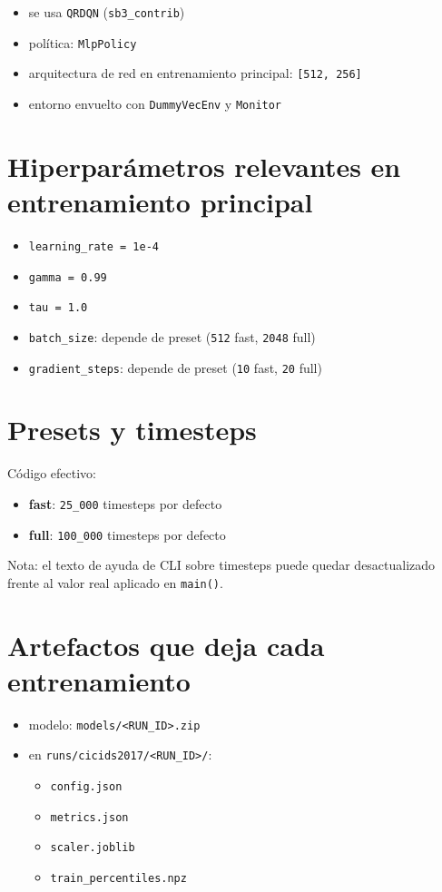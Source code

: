 ﻿\documentclass[12pt,a4paper]{article}
\begin{document}
\begin{itemize}
  \item se usa \texttt{QRDQN} (\texttt{sb3\_contrib})
  \item política: \texttt{MlpPolicy}
  \item arquitectura de red en entrenamiento principal: \texttt{[512,~256]}
  \item entorno envuelto con \texttt{DummyVecEnv} y \texttt{Monitor}
\end{itemize}

\section{Hiperparámetros relevantes en entrenamiento principal}

\begin{itemize}
  \item \texttt{learning\_rate = 1e-4}
  \item \texttt{gamma = 0.99}
  \item \texttt{tau = 1.0}
  \item \texttt{batch\_size}: depende de preset (\texttt{512} fast, \texttt{2048} full)
  \item \texttt{gradient\_steps}: depende de preset (\texttt{10} fast, \texttt{20} full)
\end{itemize}

\section{Presets y timesteps}

Código efectivo:

\begin{itemize}
  \item \textbf{fast}: \texttt{25\_000} timesteps por defecto
  \item \textbf{full}: \texttt{100\_000} timesteps por defecto
\end{itemize}

Nota: el texto de ayuda de CLI sobre timesteps puede quedar desactualizado frente al valor real
aplicado en \texttt{main()}.

\section{Artefactos que deja cada entrenamiento}

\begin{itemize}
  \item modelo: \verb|models/<RUN_ID>.zip|
  \item en \verb|runs/cicids2017/<RUN_ID>/|:
    \begin{itemize}
      \item \texttt{config.json}
      \item \texttt{metrics.json}
      \item \texttt{scaler.joblib}
      \item \texttt{train\_percentiles.npz}
    \end{itemize}
\end{itemize}
\end{document}
